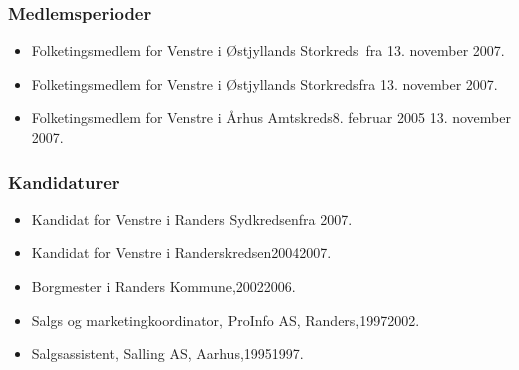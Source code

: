 \documentclass[11pt, a4paper]{awesome-cv}
\begin{document}
\begin{cvletter}
\subsubsection*{Medlemsperioder}
\begin{itemize}
\item Folketingsmedlem for Venstre i Østjyllands Storkreds fra 13. november 2007.
\item Folketingsmedlem for Venstre i Østjyllands Storkredsfra 13. november 2007.
\item Folketingsmedlem for Venstre i Århus Amtskreds8. februar 2005  13. november 2007.
\end{itemize}
\subsubsection*{Kandidaturer}
\begin{itemize}
\item Kandidat for Venstre i Randers Sydkredsenfra 2007.
\item Kandidat for Venstre i Randerskredsen20042007.
\end{itemize}
\begin{itemize}
\item Borgmester i Randers Kommune,20022006.
\item Salgs og marketingkoordinator, ProInfo AS, Randers,19972002.
\item Salgsassistent, Salling AS, Aarhus,19951997.
\end{itemize}
\end{cvletter}
\end{document}
